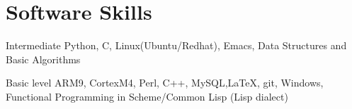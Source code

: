 \documentclass{tccv}
\begin{document}
\section{Software Skills}

\begin{factlist}

\item{Intermediate}{
    Python, C, Linux(Ubuntu/Redhat), Emacs, Data Structures and Basic Algorithms}

\item{Basic level}{
    ARM9, CortexM4, Perl, C++, MySQL,\LaTeX, git, Windows, Functional Programming in Scheme/Common Lisp (Lisp dialect)}

\end{factlist}
\end{document}
